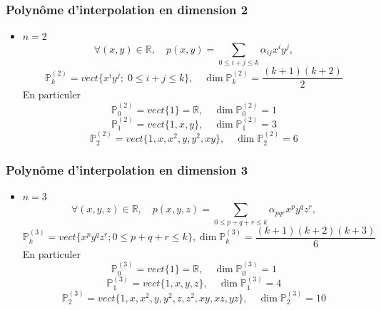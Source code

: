 \documentclass{beamer}
\begin{document}

\begin{frame}
\frametitle{Polynôme d'interpolation en dimension 2}

\begin{itemize}
\item $n=2$
\[
\forall (x,y)\in\mathbb{R},\quad p(x,y)=\sum_{0\leq i+j\leq k}\alpha_{ij}x^{i}y^j,
\]
\[\mathbb{P}_k^{(2)}=vect\{x^iy^j;\; 0\leq i+j \leq k\}, \quad \dim \mathbb{P}_k^{(2)}=\frac{(k+1)(k+2)}{2}\]
En particuler
\[\mathbb{P}_0^{(2)}=vect\{1\}=\mathbb{R} ,\quad \dim \mathbb{P}_0^{(2)}=1\]
\[\mathbb{P}_1^{(2)}=vect\{1,x,y\},\quad \dim \mathbb{P}_1^{(2)}=3\]
\[\mathbb{P}_2^{(2)}=vect\{1,x,x^2,y,y^2,xy\},\quad \dim \mathbb{P}_2^{(2)}=6\]
\end{itemize}

\end{frame}


\begin{frame}
\frametitle{Polynôme d'interpolation en dimension 3}

\begin{itemize}
\item $n=3$
\[
\forall (x,y,z)\in\mathbb{R},\quad p(x,y,z)=\sum_{0\leq p+q+r\leq k}\alpha_{pqr}x^{p}y^qz^r,
\]
\[\mathbb{P}_k^{(3)}=vect\{x^{p}y^qz^r; 0\leq p+q+r \leq k\}, \dim \mathbb{P}_k^{(3)}=\frac{(k+1)(k+2)(k+3)}{6}\]
En particuler
\[\mathbb{P}_0^{(3)}=vect\{1\}=\mathbb{R} ,\quad \dim \mathbb{P}_0^{(3)}=1\]
\[\mathbb{P}_1^{(3)}=vect\{1,x,y,z\},\quad \dim \mathbb{P}_1^{(3)}=4\]
\[\mathbb{P}_2^{(3)}=vect\{1,x,x^2,y,y^2,z,z^2,xy,xz,yz\},\quad \dim \mathbb{P}_2^{(3)}=10\]
\end{itemize}

\end{frame}
\end{document}
